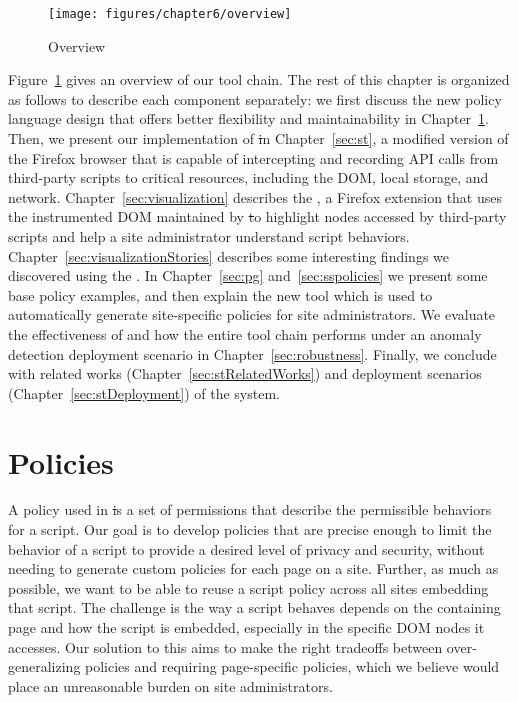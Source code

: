 \begin{figure}[tbh]
\centering
\texttt{[image: figures/chapter6/overview]}
\caption{Overview}
\label{fig:stOverview}
\end{figure}

Figure~\ref{fig:stOverview} gives an overview of our tool chain.  The rest of this chapter is organized as follows to describe each component separately: we first discuss the new policy language design that offers better flexibility and maintainability in Chapter~\ref{sec:policy}.  Then, we present our implementation of \st in Chapter~\ref{sec:st}, a modified version of the Firefox browser that is capable of intercepting and recording API calls from third-party scripts to critical resources, including the DOM, local storage, and network.  Chapter~\ref{sec:visualization} describes the \vis, a Firefox extension that uses the instrumented DOM maintained by \st to highlight nodes accessed by third-party scripts and help a site administrator understand script behaviors.  Chapter~\ref{sec:visualizationStories} describes some interesting findings we discovered using the \vis.  In Chapter~\ref{sec:pg} and~\ref{sec:sspolicies} we present some base policy examples, and then explain the new \pg tool which is used to automatically generate site-specific policies for site administrators.  We evaluate the effectiveness of \pg and how the entire tool chain performs under an anomaly detection deployment scenario in Chapter~\ref{sec:robustness}.  Finally, we conclude with related works (Chapter~\ref{sec:stRelatedWorks}) and deployment scenarios (Chapter~\ref{sec:stDeployment}) of the system.

\section{Policies}
\label{sec:policy}

A policy used in \st is a set of permissions that describe the permissible
behaviors for a script.  Our goal is to develop policies that are
precise enough to limit the behavior of a script to provide a desired
level of privacy and security, without needing to generate custom
policies for each page on a site.  Further, as much as possible, we want
to be able to reuse a script policy across all sites embedding that
script.  The challenge is the way a script behaves depends on the
containing page and how the script is embedded, especially in the
specific DOM nodes it accesses.  Our solution to this aims to make the
right tradeoffs between over-generalizing policies and requiring
page-specific policies, which we believe would place an unreasonable
burden on site administrators.

